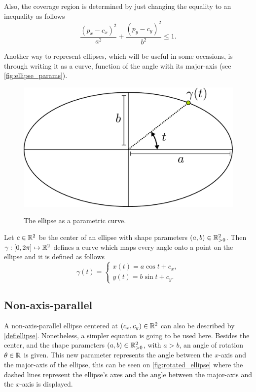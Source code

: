 Also, the coverage region is determined by just changing the equality to an inequality as follows
\begin{equation}\label{equation:cover_pellipse}
\frac{(p_x-c_x)^2}{a^2} + \frac{(p_y-c_y)^2}{b^2} \le 1.
\end{equation}

Another way to represent ellipses, which will be useful in some occasions, is through writing it as a curve, function of the angle with its major-axis (see \autoref{fig:ellipse_params}).

\begin{figure}[H]
    \centering
    
    \caption{The ellipse as a parametric curve.}
%    
   	\includegraphics[scale=.4]{tex/figures/ellipse_definition.pdf}
    \fautor
    \label{fig:ellipse_params}
\end{figure}

Let $c \in \mathbb{R}^2$ be the center of an ellipse with shape parameters $(a,b) \in \mathbb{R}^2_{>0}$. Then $\gamma : [0, 2\pi] \mapsto \mathbb{R}^2$ defines a curve which maps every angle onto a point on the ellipse and it is defined as follows
\begin{equation}\label{eq:parametric_ellipse}
\gamma(t) = \left\{
\begin{array}{l}
x(t)= a\cos{t} + c_x,\\
y(t)=b\sin{t} + c_y.
\end{array}
\right.
\end{equation}

\subsection{Non-axis-parallel}

A non-axis-parallel ellipse centered at $(c_x, c_y)\in\mathbb{R}^2$ can also be described by \autoref{def:ellipse}. Nonetheless, a simpler equation is going to be used here. Besides the center, and the shape parameters $(a, b) \in \mathbb{R}^2_{>0}$, with $a > b$, an angle of rotation $\theta \in \mathbb{R}$ is given. This new parameter represents the angle between the $x$-axis and the major-axis of the ellipse, this can be seen on \autoref{fig:rotated_ellipse} where the dashed lines represent the ellipse's axes and the angle between the major-axis and the $x$-axis is displayed.

